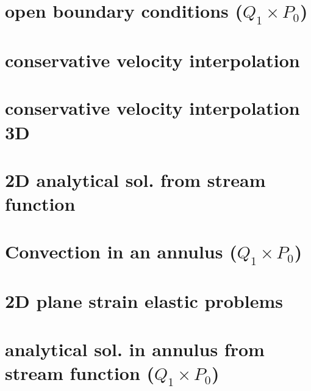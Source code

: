 \documentclass[a4paper,11pt]{report}
\begin{document}
\chapter{open boundary conditions ($Q_1\times P_0$)\label{f29}} %

\chapter{conservative velocity interpolation \label{f30}} %

\chapter{conservative velocity interpolation 3D \label{f31}} %

\chapter{2D analytical sol. from stream function \label{f32}} %

\chapter{Convection in an annulus  ($Q_1\times P_0$)  \label{f33}} %

\chapter{2D plane strain elastic problems\label{f34}} %

\chapter{analytical sol. in annulus from stream function ($Q_1\times P_0$) \label{f35}} %
\end{document}
